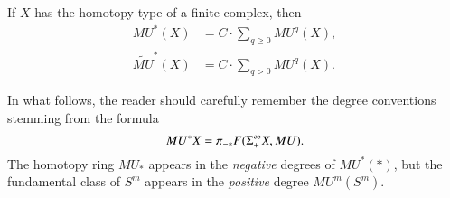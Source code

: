 \begin{theorem}\label{CGenerationForFiniteCplx}
If $X$ has the homotopy type of a finite complex, then
\begin{align*}
MU^*(X) & = C \cdot \sum_{q \ge 0} MU^q(X), \\
\widetilde{MU}^*(X) & = C \cdot \sum_{q > 0} MU^q(X).
\end{align*}
\end{theorem}
\begin{remark}
In what follows, the reader should carefully remember the degree conventions stemming from the formula \[MU^* X = \pi_{-*} F(\Sigma^\infty_+ X, MU).\]  The homotopy ring $MU_*$ appears in the \emph{negative} degrees of $MU^*(*)$, but the fundamental class of $S^{m}$ appears in the \emph{positive} degree $MU^m(S^m)$.
\end{remark}
